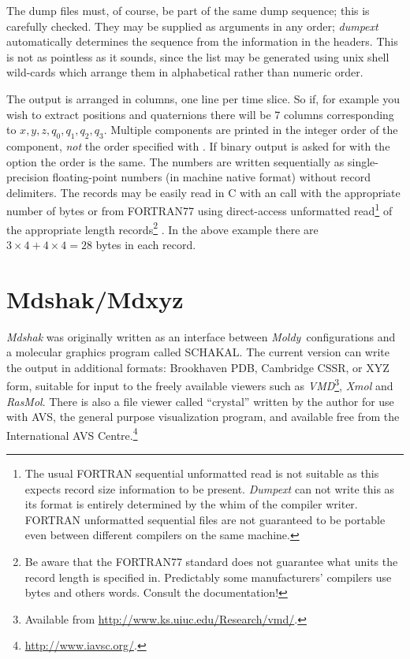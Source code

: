 \documentclass[a4paper,twoside]{report}
\newcommand{\moldy}{\emph{Moldy}}
\begin{document}
The dump files must, of course, be part of the same dump sequence;
this is carefully checked.  They may be supplied as arguments in any
order; \emph{dumpext} automatically determines the sequence from
the information in the headers.  This is not as pointless as it sounds,
since the list may be generated using unix shell wild-cards which arrange
them in alphabetical rather than numeric order.

The output is arranged in columns, one line per time slice.  So if,
for example you wish to extract positions and quaternions there will
be 7 columns corresponding to $x,y,z,q_0,q_1,q_2,q_3$. Multiple
components are printed in the integer order of the component,
\emph{not} the order specified with . If binary output is
asked for with the  option the order is the same. The numbers
are written sequentially as single-precision floating-point numbers
(in machine native format) without record delimiters.  The records may
be easily read in C with an  call with the appropriate
number of bytes or from FORTRAN77 using direct-access unformatted
read\footnote{The usual FORTRAN sequential unformatted read is not
  suitable as this expects record size information to be present.
  \emph{Dumpext} can not write this as its format is entirely
  determined by the whim of the compiler writer.  FORTRAN unformatted
  sequential files are not guaranteed to be portable even between
  different compilers on the same machine.} of the appropriate length
records\footnote{Be aware that the FORTRAN77 standard does not
  guarantee what units the record length is specified in.  Predictably
  some manufacturers' compilers use bytes and others words.  Consult
  the documentation!} .  In
the above example there are $3 \times 4 + 4 \times 4 = 28$ bytes in
each record.
\section{Mdshak/Mdxyz}%
\emph{Mdshak} was originally written as an interface between \moldy\ 
configurations and a molecular graphics program called
SCHAKAL\cite{schakal:88}.  The current version can write the output in
additional formats: Brookhaven PDB, Cambridge CSSR, or XYZ form, suitable
for input to the freely available viewers such as
\emph{VMD}\footnote{Available from
  \url{http://www.ks.uiuc.edu/Research/vmd/}.}, \emph{Xmol} and
\emph{RasMol}.  There is also a file viewer called
``crystal'' written by the author for use with AVS, the general
purpose visualization program, and available free from the
International AVS Centre.\footnote{\url{http://www.iavsc.org/}.}
\end{document}
